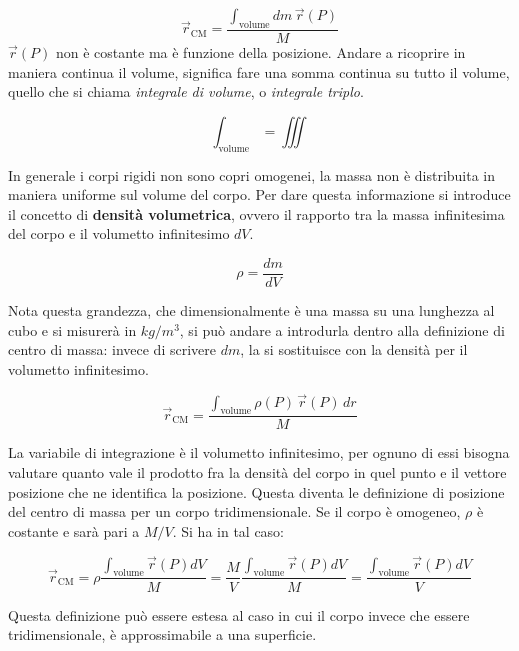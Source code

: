 \FloatBarrier

\[
	\vec{r}_\text{CM} = \frac{\int_{\text{volume}} dm\,\vec{r} (P)}{M}
\]
$\vec{r} (P)$ non è costante ma è funzione della posizione. Andare a ricoprire in maniera continua il volume, significa fare una somma continua su tutto il volume, quello che si chiama \emph{integrale di volume}, o \emph{integrale triplo}.

\[
	\int_{\text{volume}} = \iiint
\]

In generale i corpi rigidi non sono copri omogenei, la massa non è distribuita in maniera uniforme sul volume del corpo. Per dare questa informazione si introduce il concetto di \textbf{densità volumetrica}, ovvero il rapporto tra la massa infinitesima del corpo e il volumetto infinitesimo $dV$.

\[
	\rho = \frac{dm}{dV}
\]

Nota questa grandezza, che dimensionalmente è una massa su una lunghezza al cubo e si misurerà in $kg/m^3$, si può andare a introdurla dentro alla definizione di centro di massa: invece di scrivere $dm$, la si sostituisce con la densità per il volumetto infinitesimo.

\[
	\vec{r}_\text{CM} = \frac{\int_{\text{volume}}\rho (P)\, \vec{r} (P)\, dr}{M}
\]

La variabile di integrazione è il volumetto infinitesimo, per ognuno di essi bisogna valutare quanto vale il prodotto fra la densità del corpo in quel punto e il vettore posizione che ne identifica la posizione. Questa diventa le definizione di posizione del centro di massa per un corpo tridimensionale. Se il corpo è omogeneo, $\rho$ è costante e sarà pari a $M/V$. Si ha in tal caso:

\[
	\vec{r}_\text{CM} = \rho \frac{\int_{\text{volume}}\vec{r} (P)dV }{M} = \frac{M}{V} \frac{\int_{\text{volume}}\vec{r} (P)dV }{M} = \frac{\int_{\text{volume}}\vec{r} (P)dV }{V}
\]

Questa definizione può essere estesa al caso in cui il corpo invece che essere tridimensionale, è approssimabile a una superficie.

